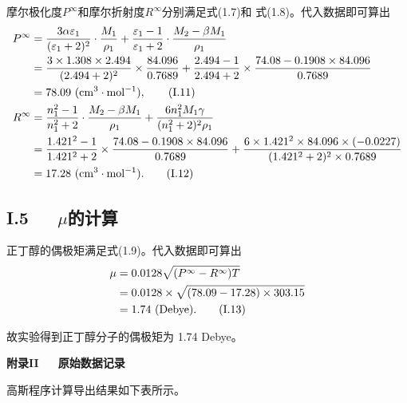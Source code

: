 \documentclass[12pt]{ctexart}
\numberwithin{equation}{section}
\begin{document}
摩尔极化度$P^\infty$和摩尔折射度$R^\infty$分别满足式(1.7)和
式(1.8)。代入数据即可算出
\begin{align}
    P^\infty
    &= \frac{3\alpha\varepsilon_1}{(\varepsilon_1 + 2)^2}
        \cdot\frac{M_1}{\rho_1}
        + \frac{\varepsilon_1 - 1}{\varepsilon_1 + 2}
        \cdot\frac{M_2 - \beta M_1}{\rho_1} \notag \\
    &= \frac{3\times 1.308\times 2.494}{(2.494+2)^2}
        \times \frac{84.096}{0.7689} + \frac{2.494-1}{2.494+2}
        \times \frac{74.08-0.1908\times 84.096}{0.7689} \notag \\
    &= 78.09 ~\mathrm{(cm^3\cdot mol^{-1})}, \tag{I.11} \\
    R^\infty
    &= \frac{n_1^2 - 1}{n_1^2 + 2}
        \cdot\frac{M_2 - \beta M_1}{\rho_1}
        + \frac{6n_1^2 M_1 \gamma}{(n_1^2 + 2)^2\rho_1} \notag \\
    &= \frac{1.421^2-1}{1.421^2+2}
        \times \frac{74.08-0.1908\times 84.096}{0.7689}
        + \frac{6\times 1.421^2\times 84.096\times (-0.0227)}
               {(1.421^2+2)^2\times 0.7689} \notag \\
    &= 17.28 ~\mathrm{(cm^3\cdot mol^{-1})}. \tag{I.12}
\end{align}

\subsection*{I.5~~~$\mu$的计算}

正丁醇的偶极矩满足式(1.9)。代入数据即可算出
\begin{align}
    \mu
    &= 0.0128\sqrt{(P^\infty - R^\infty)T} \notag \\
    &= 0.0128\times\sqrt{(78.09-17.28)\times 303.15} \notag \\
    &= 1.74 ~\mathrm{(Debye)}. \tag{I.13}
\end{align}

故实验得到正丁醇分子的偶极矩为 1.74 Debye。

\newpage
\begin{center}
    \Large\bfseries{附录II~~~原始数据记录}
\end{center}

高斯程序计算导出结果如下表所示。
\end{document}
